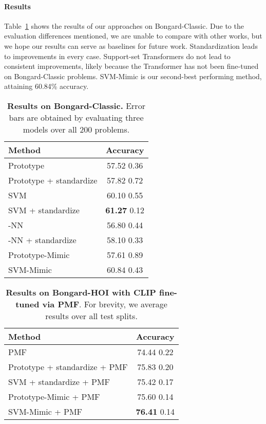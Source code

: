 \paragraph{Results} Table~\ref{tab:simple} shows the results of our approaches on Bongard-Classic. Due to the  evaluation differences mentioned, we are unable to compare with other works, but we hope our results can serve as baselines for future work. Standardization leads to improvements in every case. Support-set Transformers do not lead to consistent improvements, likely because 
the Transformer has not been fine-tuned on Bongard-Classic problems. SVM-Mimic is our second-best performing method, attaining 60.84\% accuracy.


\begin{table}
  \centering
    \begin{tabular}{lc}
    \toprule
    Method & Accuracy \\
    \midrule
    Prototype & 57.52  0.36 \\
    Prototype + standardize & 57.82  0.72 \\
    SVM & 60.10  0.55 \\
    SVM + standardize & \textbf{61.27}  0.12 \\
    -NN & 56.80  0.44 \\
    -NN + standardize & 58.10  0.33 \\
    Prototype-Mimic & 57.61  0.89 \\
    SVM-Mimic & 60.84  0.43 \\
    \bottomrule
  \end{tabular}
    \caption{\textbf{Results on Bongard-Classic.} Error bars are obtained by evaluating three models over all 200 problems.}
  \label{tab:simple}

\end{table}


\begin{table}
    \centering
      \begin{tabular}{lc}
      \toprule
      Method & Accuracy \\
      \midrule
      PMF~\cite{hu2022pushing} &  74.44  0.22  \\
      Prototype + standardize + PMF &  75.83  0.20  \\
      SVM + standardize + PMF & 75.42  0.17 \\
      Prototype-Mimic + PMF &  75.60  0.14 \\
      SVM-Mimic + PMF & \textbf{76.41}  0.14 \\
      \bottomrule
    \end{tabular}
        \caption{\textbf{Results on Bongard-HOI with CLIP fine-tuned via PMF}. For brevity, we average results over all test splits.}
    \label{tab:pmf}

\end{table}

